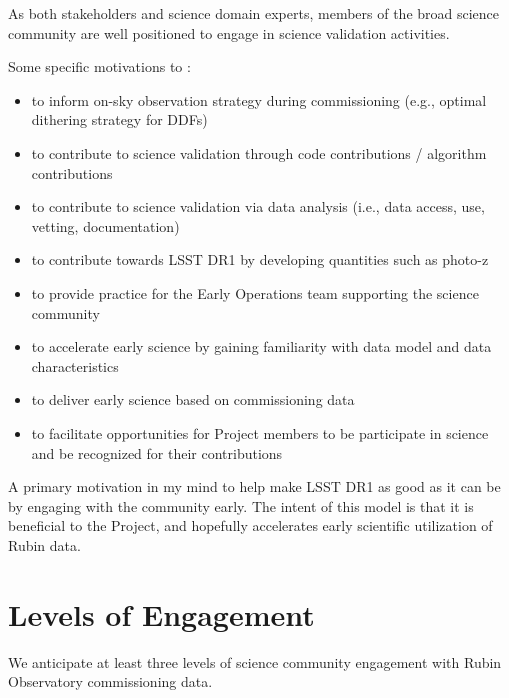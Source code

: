 \documentclass[SE,authoryear,toc]{lsstdoc}
\begin{document}
As both stakeholders and science domain experts, members of the broad science community are well positioned to engage in science validation activities. 


Some specific motivations to :

\begin{itemize}
\item to inform on-sky observation strategy during commissioning (e.g., optimal dithering strategy for DDFs)
\item to contribute to science validation through code contributions / algorithm contributions
\item to contribute to science validation via data analysis (i.e., data access, use, vetting, documentation)
\item to contribute towards LSST DR1 by developing quantities such as photo-z
\item to provide practice for the Early Operations team supporting the science community
\item to accelerate early science by gaining familiarity with data model and data characteristics
\item to deliver early science based on commissioning data
\item to facilitate opportunities for Project members to be participate in science and be recognized for their contributions
\end{itemize}

A primary motivation in my mind to help make LSST DR1 as good as it can be by engaging with the community early. The intent of this model is that it is beneficial to the Project, and hopefully accelerates early scientific utilization of Rubin data.

\section{Levels of Engagement}

We anticipate at least three levels of science community engagement with Rubin Observatory commissioning data. 
\end{document}
